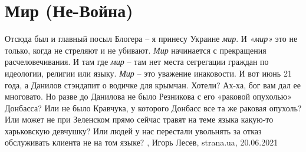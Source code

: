  
 
 
 
 
\chapter{Мир (Не-Война)}

Отсюда был и главный посыл Блогера – я принесу Украине \emph{мир}. И \emph{«мир»} это не
только, когда не стреляют и не убивают. \emph{Мир} начинается с прекращения
расчеловечивания. И там где \emph{мир} – там нет места сегрегации граждан по
идеологии, религии или языку. \emph{Мир} – это уважение инаковости.  И вот июнь 21
года, а Данилов стэндапит о водичке для крымчан. Хотели? Ах-ха, бог вам дал ее
многовато. Но разве до Данилова не было Резникова с его «раковой опухолью»
Донбасса? Или не было Кравчука, у которого Донбасс все та же раковая опухоль?
Или может не при Зеленском прямо сейчас травят на теме языка какую-то
харьковскую девчушку? Или людей у нас перестали увольнять за отказ обслуживать
клиента не на том языке?
, 
Игорь Лесев, strana.ua, 20.06.2021


